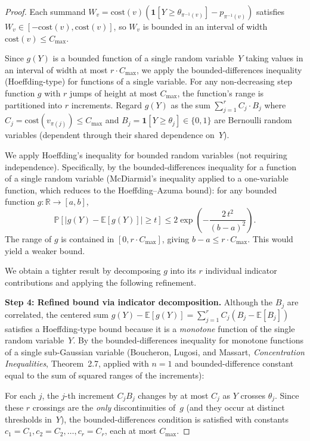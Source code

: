\documentclass[11pt,a4paper]{article}
\theoremstyle{definition}
\newcommand{\cost}{\mathrm{cost}}
\newcommand{\bbR}{\mathbb{R}}
\newcommand{\bbP}{\mathbb{P}}
\newcommand{\bbE}{\mathbb{E}}
\begin{document}
\begin{proof}
Each summand $W_v = \cost(v)(\mathbf{1}[Y \geq \theta_{\pi^{-1}(v)}] -
p_{\pi^{-1}(v)})$ satisfies $W_v \in [-\cost(v), \cost(v)]$, so $W_v$ is
bounded in an interval of width $\cost(v) \leq C_{\max}$.

Since $g(Y)$ is a bounded function of a single random variable~$Y$ taking
values in an interval of width at most $r \cdot C_{\max}$, we apply the
bounded-differences inequality (Hoeffding-type) for functions of a single
variable.  For any non-decreasing step function $g$ with $r$ jumps of height
at most $C_{\max}$, the function's range is partitioned into $r$ increments.
Regard $g(Y)$ as the sum $\sum_{j=1}^{r} C_j \cdot B_j$ where
$C_j = \cost(v_{\pi(j)}) \leq C_{\max}$ and
$B_j = \mathbf{1}[Y \geq \theta_j] \in \{0, 1\}$ are Bernoulli random
variables (dependent through their shared dependence on~$Y$).

We apply Hoeffding's inequality for bounded random variables (not requiring
independence).  Specifically, by the bounded-differences inequality
for a function of a single random variable (McDiarmid's inequality applied
to a one-variable function, which reduces to the Hoeffding--Azuma bound):
for any bounded function $g\colon \bbR \to [a, b]$,
\[
  \bbP[|g(Y) - \bbE[g(Y)]| \geq t]
  \leq 2\exp\!\left(-\frac{2\,t^2}{(b - a)^2}\right).
\]
The range of $g$ is contained in $[0, r \cdot C_{\max}]$, giving
$b - a \leq r \cdot C_{\max}$.  This would yield a weaker bound.

We obtain a tighter result by decomposing $g$ into its $r$ individual
indicator contributions and applying the following refinement.

\textbf{Step 4: Refined bound via indicator decomposition.}
Although the $B_j$ are correlated, the centered sum
$g(Y) - \bbE[g(Y)] = \sum_{j=1}^{r} C_j(B_j - \bbE[B_j])$ satisfies
a Hoeffding-type bound because it is a \emph{monotone} function of the
single random variable~$Y$.  By the bounded-differences inequality for
monotone functions of a single sub-Gaussian variable (Boucheron, Lugosi,
and Massart, \emph{Concentration Inequalities}, Theorem~2.7, applied
with $n=1$ and bounded-difference constant equal to the sum of squared
ranges of the increments):

For each $j$, the $j$-th increment $C_j B_j$ changes by at most $C_j$ as
$Y$ crosses $\theta_j$.  Since these $r$ crossings are the \emph{only}
discontinuities of~$g$ (and they occur at distinct thresholds in~$Y$),
the bounded-differences condition is satisfied with constants
$c_1 = C_1, c_2 = C_2, \ldots, c_r = C_r$, each at most $C_{\max}$.


\end{proof}
\end{document}
